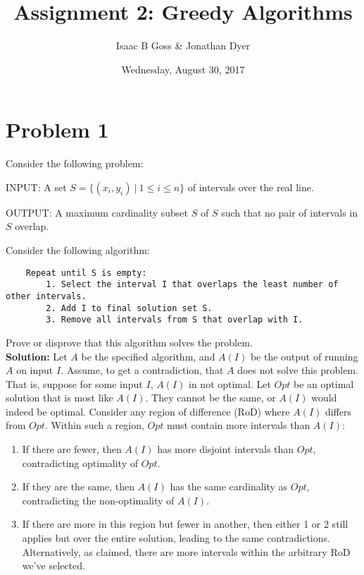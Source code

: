 \documentclass{article}
\author{Isaac B Goss \& Jonathan Dyer}
\title{Assignment 2: Greedy Algorithms}
\date{Wednesday, August 30, 2017}
\providecommand{\soln}{\textbf{Solution: }}
\begin{document}
\maketitle

    \section*{Problem 1}
    Consider the following problem:
    
    INPUT: A set $S = \{(x_i, y_i)\ |\ 1 \leq i \leq n\}$ of intervals over the real line.
    
    OUTPUT: A maximum cardinality subset $S$ of $S$ such that no pair of intervals in $S$ overlap.
        
    Consider the following algorithm:
    
    \begin{lstlisting}
    Repeat until S is empty:
        1. Select the interval I that overlaps the least number of other intervals.
        2. Add I to final solution set S.
        3. Remove all intervals from S that overlap with I.
    \end{lstlisting}

    Prove or disprove that this algorithm solves the problem.\\
    
    \soln Let $A$ be the specified algorithm, and $A(I)$ be the output of running $A$ on input $I$.
    Assume, to get a contradiction, that $A$ does not solve this problem.
    That is, suppose for some input $I$, $A(I)$ in not optimal.
    Let $Opt$ be an optimal solution that is most like $A(I)$.
    They cannot be the same, or $A(I)$ would indeed be optimal.
    Consider any region of difference (RoD) where $A(I)$ differs from $Opt$.
    Within such a region, $Opt$ must contain more intervals than $A(I)$:
    
    \begin{enumerate}
        \item If there are fewer, then $A(I)$ has more disjoint intervals than $Opt$, contradicting optimality of $Opt$.
        \item If they are the same, then $A(I)$ has the same cardinality as $Opt$, contradicting the non-optimality of $A(I)$.
        \item If there are more in this region but fewer in another, then either 1 or 2 still applies but over the entire solution, leading to the same contradictions. Alternatively, as claimed, there are more intervals within the arbitrary RoD we've selected.
    \end{enumerate}
    
\end{document}
